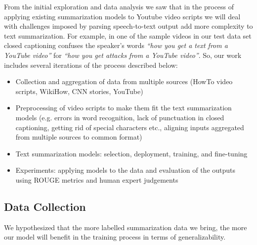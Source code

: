 \documentclass{article}
\begin{document}
From the initial exploration and data analysis we saw that in the process of applying existing summarization models to Youtube video scripts  we will deal with challenges imposed by parsing speech-to-text output add more complexity to text summarization. For example, in one of the sample videos in our test data set closed captioning confuses the speaker’s words \emph{“how you get a text from a YouTube video”} for  \emph{“how you get attacks from a YouTube video”}. So, our work includes several iterations of the process described below:
\begin{itemize}
\item Collection and aggregation of data from multiple sources (HowTo video scripts, WikiHow, CNN stories, YouTube)
\item Preprocessing of video scripts to make them fit the text summarization models (e.g. errors in word recognition, lack of punctuation in closed captioning, getting rid of special characters etc., aligning inputs aggregated from multiple sources  to common format)
\item Text summarization models: selection, deployment, training,  and fine-tuning 
\item Experiments: applying models to the data and evaluation of the outputs using ROUGE metrics and human expert judgements
\end{itemize}
 
\subsection{Data Collection}
We hypothesized that the more labelled summarization data we bring, the more our model will benefit in the training process in terms of generalizability. 
\end{document}
